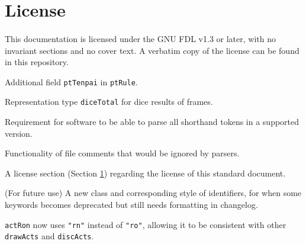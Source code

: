\documentclass[%
	a4paper%
	,10pt%
	,twoside%
	,notitlepage%
]{article}%
\newcommand*{\github}[1]{\texorpdfstring{\href{https://github.com/#1}{\texttt{#1}}}{#1}}%
\begin{document}
\section{License}\label{sec:license}%
% 
	\paragraph*{}This documentation is licensed under the GNU FDL v1.3 or later, with no invariant sections and no cover text. A verbatim copy of the license can be found in this repository. %
\begin{changelog}[%
	section=true%
	,sectioncmd={\section}%
	,title={Changelog}%
	,label={sec:changelog}%
]%
% 
	\begin{version}[%
		version=\currentVer{}%
		,author={\github{ChemistMikeLam}}%
		,date=\releaseDate{}%
	]%
		\added{}%
			\item{}Additional field \lstinline/ptTenpai/ in \lstinline/ptRule/. %
			\item{}Representation type \lstinline/diceTotal/ for dice results of frames. %
			\item{}Requirement for software to be able to parse all shorthand tokens in a supported version. %
			\item{}Functionality of file comments that would be ignored by parsers. %
			\item{}A license section (Section \ref{sec:license}) regarding the license of this standard document. %
			\item{}(For future use) A new class and corresponding style of identifiers, for when some keywords becomes deprecated but still needs formatting in changelog. %
		\changed{}%
			\item{}\lstinline/actRon/ now uses \lstinline/"rn"/ instead of \lstinline/"ro"/, allowing it to be consistent with other \lstinline/drawActs/ and \lstinline/discActs/. %

\end{version}
\end{changelog}
\end{document}
